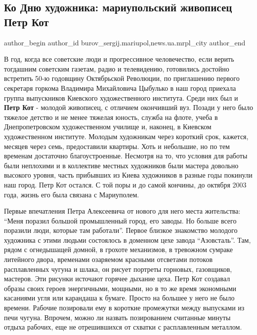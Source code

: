  
 
 
 
 
 
\subsection{Ко Дню художника: мариупольский живописец Петр Кот}
\label{sec:12_10_2019.stz.news.ua.mrpl_city.1.mariupol_zhivopisec_petr_kot}
 
\ifcmt
 author_begin
   author_id burov_sergij.mariupol,news.ua.mrpl_city
 author_end
\fi

В год, когда все советские люди и прогрессивное человечество, если верить
тогдашним советским газетам, радио и телевидению, готовились достойно встретить
50-ю годовщину Октябрьской Революции, по приглашению первого секретаря горкома
Владимира Михайловича Цыбулько в наш город приехала группа выпускников
Киевского художественного института. Среди них был и \textbf{Петр Кот} - молодой
живописец, с отличием окончивший вуз. Позади у него было тяжелое детство и не
менее тяжелая юность, служба на флоте, учеба в Днепропетровском художественном
училище и, наконец, в Киевском художественном институте. Молодым художникам
через короткий срок, кажется, месяцев через семь, предоставили квартиры. Хоть и
небольшие, но по тем временам достаточно благоустроенные. Несмотря на то, что
условия для работы были неплохими и в коллективе местных художников были
мастера довольно высокого уровня, часть прибывших из Киева художников в разные
годы покинули наш город. Петр Кот остался. С той поры и до самой кончины, до
октября 2003 года, жизнь его была связана с Мариуполем.


Первые впечатления Петра Алексеевича от нового для него места жительства: \enquote{Меня
поразил большой промышленный город, его заводы. Но больше всего поразили люди,
которые там работали}. Первое близкое знакомство молодого художника с этими
людьми состоялось в доменном цехе завода \enquote{Азовсталь}. Там, рядом с огнедышащей
домной, в грохоте механизмов, в тревожном сумраке литейного двора, временами
озаряемом красными отсветами потоков расплавленных чугуна и шлака, он рисует
портреты горновых, газовщиков, мастеров. Эти рисунки источают горячее дыхание
цеха. Петр Кот создавал образы своих героев энергичными, мощными, но в то же
время экономными касаниями угля или карандаша к бумаге. Просто на большее у
него не было времени. Рабочие позировали ему в короткие промежутки между
выпусками из печи чугуна. Впрочем, можно ли назвать позированием считанные
минуты отдыха рабочих, еще не отрешившихся от схватки с расплавленным металлом.

